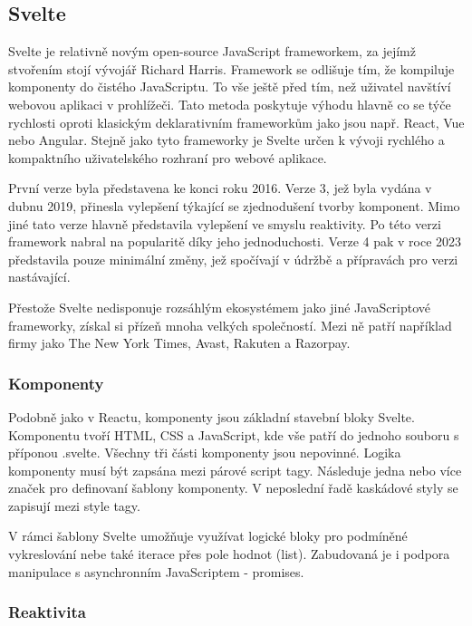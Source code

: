 \subsection{Svelte}

Svelte je relativně novým open-source JavaScript frameworkem, za jejímž stvořením stojí vývojář Richard Harris. 
Framework se odlišuje tím, že kompiluje komponenty do čistého JavaScriptu. To vše ještě před tím, než uživatel navštíví webovou aplikaci v prohlížeči. 
Tato metoda poskytuje výhodu hlavně co se týče rychlosti oproti klasickým deklarativním frameworkům jako jsou např. React, Vue nebo Angular. 
Stejně jako tyto frameworky je Svelte určen k vývoji rychlého a kompaktního uživatelského rozhraní pro webové aplikace.

První verze byla představena ke konci roku 2016. Verze 3, jež byla vydána v dubnu 2019, přinesla vylepšení týkající se zjednodušení tvorby komponent. 
Mimo jiné tato verze hlavně představila vylepšení ve smyslu reaktivity. Po této verzi framework nabral na popularitě díky jeho jednoduchosti.
Verze 4 pak v roce 2023 představila pouze minimální změny, jež spočívají v údržbě a přípravách pro verzi nastávající.

Přestože Svelte nedisponuje rozsáhlým ekosystémem jako jiné JavaScriptové frameworky, získal si přízeň mnoha velkých společností. 
Mezi ně patří například firmy jako The New York Times, Avast, Rakuten a Razorpay.\cite{sveltemdn,svelte,sveltedevinterface}


\subsubsection{Komponenty}

Podobně jako v Reactu, komponenty jsou základní stavební bloky Svelte. Komponentu tvoří HTML, CSS a JavaScript, kde vše patří do jednoho souboru s příponou .svelte. 
Všechny tři části komponenty jsou nepovinné. Logika komponenty musí být zapsána mezi párové script tagy. Následuje jedna nebo více značek pro definovaní šablony komponenty. 
V neposlední řadě kaskádové styly se zapisují mezi style tagy.

V rámci šablony Svelte umožňuje využívat logické bloky pro podmíněné vykreslování nebe také iterace přes pole hodnot (list). 
Zabudovaná je i podpora manipulace s asynchronním JavaScriptem - promises.\cite{svelte}

\subsubsection{Reaktivita}

